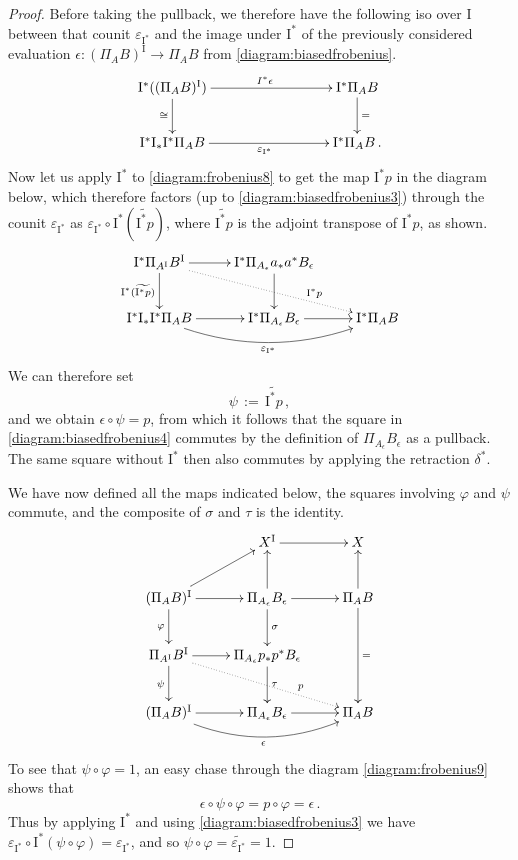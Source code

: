 \documentclass[11pt,reqno]{amsart}
\renewcommand{\to}{\ensuremath{\rightarrow}}
\newcommand{\I}{\ensuremath{\mathrm{I}}}
\theoremstyle{remark}
\theoremstyle{definition}
\begin{document}
\begin{proof}
Before taking the pullback, we therefore have the following iso over $\I$ between that counit $\varepsilon_{\I^*}$ and the image under $\I^*$ of the previously considered evaluation $\epsilon : (\Pi_AB)^\I \to \Pi_AB$ from \eqref{diagram:biasedfrobenius}.
\begin{equation}\label{diagram:biasedfrobenius3}
\xymatrix{
\I^*((\Pi_AB)^\I) \ar[d]_{\cong}  \ar[rrr]^{\\I^*\epsilon} &&& \I^*\Pi_AB  \ar[d]^{=} \\
\I^*\I_*\I^*\Pi_AB   \ar[rrr]_{\varepsilon_{\I^*}}  &&&  \I^*\Pi_AB\,.
}
\end{equation}
%
Now let us apply $\I^*$ to  \eqref{diagram:frobenius8} to get the map $\I^*p$ in the diagram below, which therefore factors (up to \eqref{diagram:biasedfrobenius3}) through the counit $\varepsilon_{\I^*}$ as $\varepsilon_{\I^*}\circ\I^*(\widetilde{\I^*p})$, where $\widetilde{\I^*p}$ is the adjoint transpose of $\I^*p$, as shown.
%
\begin{equation}\label{diagram:biasedfrobenius4}
\xymatrix{
\I^*\Pi_{A^\I}B^\I \ar[d]_{\I^*(\widetilde{\I^*p})} \ar[r] \ar@{..>}[rrd]^>>>>>>>>>>>{\I^*p} & \I^*\Pi_{A_\epsilon} a_*a^* B_\epsilon \ar[d] & \\
  \I^*\I_*\I^*\Pi_AB  \ar[r] \ar@/_4ex/ [rr]_{\varepsilon_{\I^*}} & \I^*\Pi_{A_\epsilon}B_\epsilon \ar[r] & \I^*\Pi_{A}B 
}
\end{equation}
%
We can therefore set 
\[
\psi\, := \, \widetilde{\I^*p}\,,
\]
and we obtain $\epsilon\circ \psi = p$, from which it follows that the square in \eqref{diagram:biasedfrobenius4} commutes by the definition of $\Pi_{A_\epsilon}B_\epsilon$ as a pullback. The same square without $\I^*$ then also commutes by applying the retraction $\delta^*$.  

We have now defined all the maps indicated below, the squares involving $\varphi$ and $\psi$ commute, and the  composite of $\sigma$ and $\tau$  is the identity.
\begin{equation}\label{diagram:frobenius9}
\xymatrix{
& X^\I \ar[r] & X \\
 (\Pi_AB)^\I  \ar[r]  \ar[ru] \ar[d]_{\varphi} 
 	& \Pi_{A_\epsilon}B_\epsilon  \ar[u] \ar[d]^\sigma \ar[r] & \Pi_{A}B \ar[u]\ar[dd]^= \\
 \Pi_{A^\I}B^\I \ar[r] \ar[d]_{\psi} \ar@{..>}[rrd]^>>>>>>>>>>>{p} 
 	& \Pi_{A_\epsilon} p_*p^* B_\epsilon \ar[d]^\tau & \\
  (\Pi_AB)^\I  \ar[r] \ar@/_4ex/ [rr]_\epsilon & \Pi_{A_\epsilon}B_\epsilon \ar[r] & \Pi_{A}B 
}
\end{equation}
%
To see that $\psi\circ\varphi = 1$, an easy chase through the diagram \eqref{diagram:frobenius9} shows that
\[
\epsilon\circ \psi\circ\varphi = p \circ \varphi = \epsilon\,.
\]
Thus by applying $\I^*$ and using \eqref{diagram:biasedfrobenius3} we have $
\varepsilon_{\I^*} \circ \I^*(\psi \circ\varphi) = \varepsilon_{\I^*}$, 
and so $\psi \circ\varphi = \widetilde{\varepsilon_{\I^*}} = 1$.
\end{proof}
\end{document}
